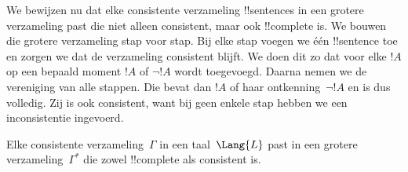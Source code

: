 \documentclass[../../../include/open-logic-section]{subfiles}
\begin{document}
      {}
      {}


\begin{explain}
We bewijzen nu dat elke consistente verzameling !!{sentence}s in een
grotere verzameling past die niet alleen consistent, maar ook
!!{complete} is. We bouwen die grotere verzameling stap voor stap. Bij
elke stap voegen we één !!{sentence} toe en zorgen we dat de verzameling
consistent blijft. We doen dit zo dat voor elke $!A$ op een bepaald
moment $!A$ of $\lnot !A$ wordt toegevoegd. Daarna nemen we de vereniging
van alle stappen. Die bevat dan $!A$ of haar ontkenning~$\lnot !A$ en is
dus volledig. Zij is ook consistent, want bij geen enkele stap hebben we
een inconsistentie ingevoerd.
\end{explain}

\begin{lem}
 Elke consistente verzameling~$\Gamma$ in een
taal~$\Lang{L}$ past in een grotere verzameling~$\Gamma^*$ die zowel
!!{complete} als consistent is.
\end{lem}
\end{document}
